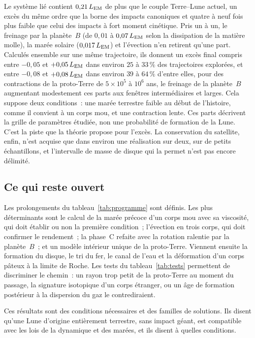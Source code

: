 \documentclass[11pt,a4paper]{article}
\newcommand{\LEM}{\ensuremath{L_{\rm EM}}}
\begin{document}
Le système lié contient $0{,}21\,\LEM$ de plus que le couple Terre--Lune actuel, un excès du même ordre que la borne des impacts canoniques et quatre à neuf fois plus faible que celui des impacts à fort moment cinétique. Pris un à un, le freinage par la planète~$B$ (de $0{,}01$ à $0{,}07\,\LEM$ selon la dissipation de la matière molle), la marée solaire ($0{,}017\,\LEM$) et l'évection n'en retirent qu'une part. Calculés ensemble sur une même trajectoire, ils donnent un excès final compris entre $-0{,}05$ et $+0{,}05\,\LEM$ dans environ $25$ à $33\,\%$ des trajectoires explorées, et entre $-0{,}08$ et $+0{,}08\,\LEM$ dans environ $39$ à $64\,\%$ d'entre elles, pour des contractions de la proto-Terre de $5\times10^5$ à $10^6$ ans, le freinage de la planète~$B$ augmentant modestement ces parts aux fenêtres intermédiaires et larges. Cela suppose deux conditions~: une marée terrestre faible au début de l'histoire, comme il convient à un corps mou, et une contraction lente. Ces parts décrivent la grille de paramètres étudiée, non une probabilité de formation de la Lune. C'est la piste que la théorie propose pour l'excès. La conservation du satellite, enfin, n'est acquise que dans environ une réalisation sur deux, sur de petits échantillons, et l'intervalle de masse de disque qui la permet n'est pas encore délimité.

\subsection*{Ce qui reste ouvert}

Les prolongements du tableau~\ref{tab:programme} sont définis. Les plus déterminants sont le calcul de la marée précoce d'un corps mou avec sa viscosité, qui doit établir ou non la première condition~; l'évection en trois corps, qui doit confirmer le rendement~; la phase~C refaite avec la rotation ralentie par la planète~$B$~; et un modèle intérieur unique de la proto-Terre. Viennent ensuite la formation du disque, le tri du fer, le canal de l'eau et la déformation d'un corps pâteux à la limite de Roche. Les tests du tableau~\ref{tab:tests} permettent de discriminer le chemin~: un rayon trop petit de la proto-Terre au moment du passage, la signature isotopique d'un corps étranger, ou un âge de formation postérieur à la dispersion du gaz le contrediraient.

\medskip
Ces résultats sont des conditions nécessaires et des familles de solutions. Ils disent qu'une Lune d'origine entièrement terrestre, sans impact géant, est compatible avec les lois de la dynamique et des marées, et ils disent à quelles conditions.
\end{document}
